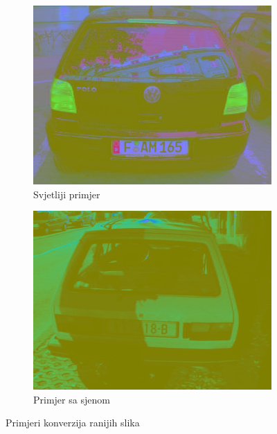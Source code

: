 \documentclass[times, utf8, diplomski]{fer}
\begin{document}
\begin{figure}[H]
     \begin{subfigure}[b]{0.4\textwidth}
         \centering
         \includegraphics[width=\textwidth]{figures/ce_examples/3/ycrcb.jpg}
         \caption{Svjetliji primjer}
     \end{subfigure}
     \hspace{1cm}
     \begin{subfigure}[b]{0.4\textwidth}
         \centering
         \includegraphics[width=\textwidth]{figures/ce_examples/4/ycrcb.jpg}
         \caption{Primjer sa sjenom}
     \end{subfigure}
        \caption{Primjeri konverzija ranijih slika}
        \label{fig:ce_ycrcb}
\end{figure}
\end{document}
